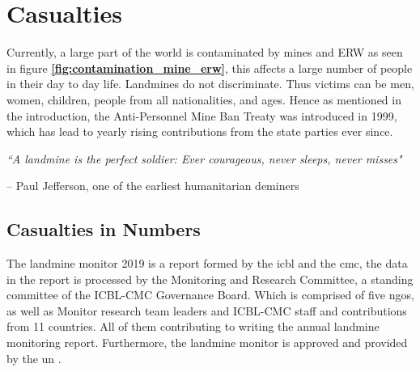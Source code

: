 \setlength{\parindent}{0pt}
\section{Casualties} \label{chap:casualties}

Currently, a large part of the world is contaminated by mines and ERW as seen in figure \textbf{\ref{fig:contamination_mine_erw}}, this affects a large number of people in their day to day life. Landmines do not discriminate. Thus victims can be men, women, children, people from all nationalities, and ages. Hence as mentioned in the introduction, the Anti-Personnel Mine Ban Treaty was introduced in 1999, which has lead to yearly rising contributions from the state parties ever since. \cite{LandmineMonitor2019} 

        \vspace{5mm}

\begin{centering}

\textit{\large “A landmine is the perfect soldier: Ever courageous, never sleeps, never misses"}\\

\begin{flushright}

        \vspace{-3mm}
        
-- Paul Jefferson, one of the earliest humanitarian deminers \hspace{4mm}

\end{flushright}
\end{centering}


\subsection{Casualties in Numbers}


The landmine monitor 2019 is a report formed by the \gls{icbl} and the \gls{cmc}, the data in the report is processed by the Monitoring and Research Committee, a standing committee of the ICBL-CMC Governance Board. Which is comprised of five \gls{ngo}s, as well as Monitor research team leaders and ICBL-CMC staff and contributions from 11 countries. All of them contributing to writing the annual landmine monitoring report. Furthermore, the landmine monitor is approved and provided by the \gls{un} \cite{LandmineMonitor2019}.

